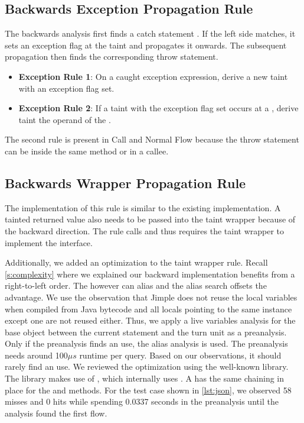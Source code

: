 \documentclass[../draft.tex]{subfiles}
\begin{document}
    \subsection{Backwards Exception Propagation Rule}
    The backwards analysis first finds a catch statement .
    If the left side matches, it sets an exception flag at the taint and propagates it onwards.
    The subsequent propagation then finds the corresponding throw statement.
    \begin{itemize}
        \item \textbf{Exception Rule 1}: On a caught exception expression, derive a new taint with an exception flag set.
        \item \textbf{Exception Rule 2}: If a taint with the exception flag set occurs at a , derive taint the operand of the .
    \end{itemize}
    The second rule is present in Call and Normal Flow because the throw statement can be inside the same method or in a callee.

    \subsection{Backwards Wrapper Propagation Rule}
    The implementation of this rule is similar to the existing implementation.
    A tainted returned value also needs to be passed into the taint wrapper because of the backward direction.
    The rule calls  and thus requires the taint wrapper to implement the  interface.

    Additionally, we added an optimization to the taint wrapper rule.
    Recall \autoref{s:complexity} where we explained our backward implementation benefits from a right-to-left order.
    The  however can alias and the alias search offsets the advantage.
    We use the observation that Jimple does not reuse the local variables when compiled from Java bytecode and all locals pointing to the same  instance except one are not reused either.
    Thus, we apply a live variables analysis for the base object between the current statement and the turn unit as a preanalysis.
    Only if the preanalysis finds an use, the alias analysis is used.
    The preanalysis needs around 100$\mu s$ runtime per query.
    Based on our observations, it should rarely find an use.
    We reviewed the optimization using the well-known \footnotemark{} library.
    The library makes use of , which internally uses . A  has the same chaining in place for the  and  methods.
    For the test case shown in \autoref{lst:json}, we observed 58 misses and 0 hits while spending 0.0337 seconds in the preanalysis until the analysis found the first flow.
\end{document}

